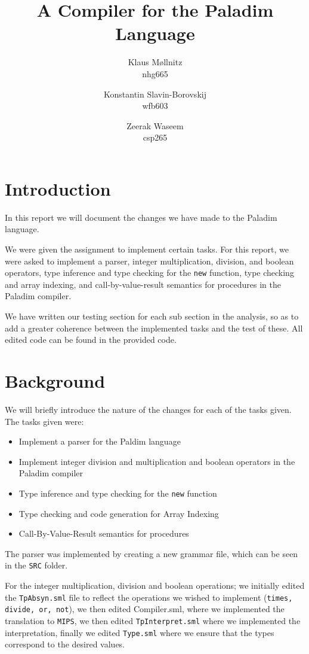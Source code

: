\documentclass[10pt]{article}
\title{A Compiler for the \textbf{Paladim} Language}
\author{
    Klaus Møllnitz\\
    nhg665
  \and
    Konstantin Slavin-Borovskij\\
    wfb603
  \and
    Zeerak Waseem\\
    csp265
}
\begin{document}
\maketitle

\renewcommand{\contentsname}{\section{Table of contents}}
\tableofcontents
\section{Introduction}
In this report we will document the changes we have made to the Paladim language. 

We were given the assignment to implement certain tasks. For this report, we were asked to implement a parser, integer multiplication, division, and boolean operators, type inference and type checking for the \texttt{new} function, type checking and array indexing, and call-by-value-result semantics for procedures in the Paladim compiler.

We have written our testing section for each sub section in the analysis, so as to add a greater coherence between the implemented tasks and the test of these. All edited code can be found in the provided code.

\section{Background}

We will briefly introduce the nature of the changes for each of the tasks given. The tasks given were:
\begin{itemize}
\item Implement a parser for the Paldim language
\item Implement integer division and multiplication and boolean operators in the Paladim compiler
\item Type inference and type checking for the \texttt{new} function
\item Type checking and code generation for Array Indexing
\item Call-By-Value-Result semantics for procedures
\end{itemize}

The parser was implemented by creating a new grammar file, which can be seen in the \texttt{SRC} folder.

For the integer multiplication, division and boolean operations; we initially edited the \texttt{TpAbsyn.sml} file to reflect the operations we wished to implement (\texttt{times, divide, or, not}), we then edited Compiler.sml, where we implemented the translation to \texttt{MIPS}, we then edited \texttt{TpInterpret.sml} where we implemented the interpretation, finally we edited \texttt{Type.sml} where we ensure that the types correspond to the desired values.
\end{document}
